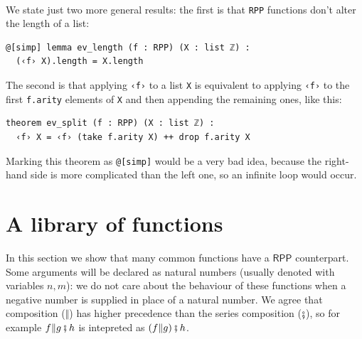 \documentclass[oneside]{book}
\theoremstyle{definition}
\theoremstyle{remark}
\theoremstyle{plain}
\newcommand{\RPP}{\mathsf{RPP}}
\newcommand{\rppCo}{\fatsemi}
\newcommand{\rppPa}{\Vert}
\begin{document}
\paragraph{}

We state just two more general results:
the first is that \lstinline{RPP} functions don't alter the length of a list:
\begin{lstlisting}
@[simp] lemma ev_length (f : RPP) (X : list ℤ) :
  (‹f› X).length = X.length
\end{lstlisting}
The second is that applying \lstinline{‹f›} to a list \lstinline{X}
is equivalent to applying \lstinline{‹f›} to the first \lstinline{f.arity} elements of \lstinline{X}
and then appending the remaining ones, like this:
\begin{lstlisting}
theorem ev_split (f : RPP) (X : list ℤ) :
  ‹f› X = ‹f› (take f.arity X) ++ drop f.arity X
\end{lstlisting}
Marking this theorem as \lstinline{@[simp]} would be a very bad idea,
because the right-hand side is more complicated than the left one,
so an infinite loop would occur.

\section{A library of functions}

In this section we show that many common functions have a $\RPP$ counterpart.
Some arguments will be declared as natural numbers (usually denoted with variables $n, m$):
we do not care about the behaviour of these functions when a negative number is supplied in place of a natural number.
We agree that composition ($\rppPa$) has higher precedence than the series composition ($\rppCo$),
so for example $f \rppPa g \rppCo h$ is intepreted as $(f \rppPa g) \rppCo h$.
\end{document}
